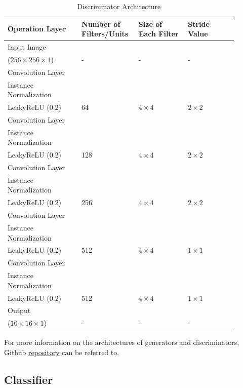 \begin{table}[H]
    \centering

    \begin{tabular}{P{0.30\linewidth} P{0.20\linewidth} P{0.20\linewidth} P{0.20\linewidth}} 
        \toprule
        \textbf{Operation Layer} & \textbf{Number of Filters/Units}  & \textbf{Size of Each Filter} & \textbf{Stride Value}\\
        \toprule
        \toprule
        Input Image \\($256 \times 256 \times 1$) & - & - & -\\
        \midrule
        Convolution Layer\\Instance Normalization\\LeakyReLU (0.2) & 64 & $4 \times 4$ & $2 \times 2$\\
        \midrule
        Convolution Layer\\Instance Normalization\\LeakyReLU (0.2) & 128 & $4 \times 4$ & $2 \times 2$\\
        \midrule
        Convolution Layer\\Instance Normalization\\LeakyReLU (0.2) & 256 & $4 \times 4$ & $2 \times 2$\\
        \midrule
        Convolution Layer\\Instance Normalization\\LeakyReLU (0.2) & 512 & $4 \times 4$ & $1 \times 1$\\
        \midrule
        Convolution Layer\\Instance Normalization\\LeakyReLU (0.2) & 512 & $4 \times 4$ & $1 \times 1$\\
        \midrule
        \midrule
        Output  \\($16 \times 16 \times 1$) & - & - & -\\
        \bottomrule
    \end{tabular}
    \caption[Discriminator Architecture]{Discriminator Architecture}
    \label{table:DiscriminatorArchitecture}
\end{table}

For more information on the architectures of generators and discriminators, Github \href{https://github.com/jcjohnson/fast-neural-style}{repository} can be referred to. 



\subsection{Classifier}

